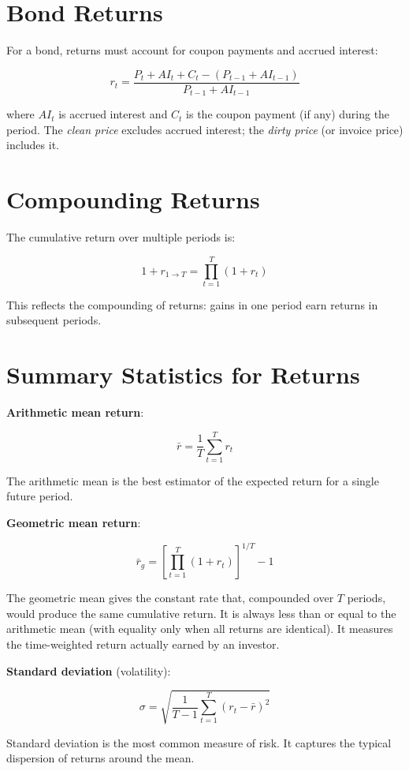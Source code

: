 \documentclass[11pt,letterpaper]{report}
\begin{document}
\section{Bond Returns}


For a bond, returns must account for coupon payments and accrued interest:

$$r_t = \frac{P_t + AI_t + C_t - (P_{t-1} + AI_{t-1})}{P_{t-1} + AI_{t-1}}$$

where $AI_t$ is accrued interest and $C_t$ is the coupon payment (if any) during the period.  The \textit{clean price} excludes accrued interest; the \textit{dirty price} (or invoice price) includes it.

\section{Compounding Returns}


The cumulative return over multiple periods is:

$$1 + r_{1 \to T} = \prod_{t=1}^{T}(1 + r_t)$$

This reflects the compounding of returns: gains in one period earn returns in subsequent periods.

\section{Summary Statistics for Returns}


\textbf{Arithmetic mean return}:

$$\bar{r} = \frac{1}{T}\sum_{t=1}^{T} r_t$$

The arithmetic mean is the best estimator of the expected return for a single future period.

\textbf{Geometric mean return}:

$$\bar{r}_g = \left[\prod_{t=1}^{T}(1+r_t)\right]^{1/T} - 1$$

The geometric mean gives the constant rate that, compounded over $T$ periods, would produce the same cumulative return.  It is always less than or equal to the arithmetic mean (with equality only when all returns are identical).  It measures the time-weighted return actually earned by an investor.

\textbf{Standard deviation} (volatility):

$$\sigma = \sqrt{\frac{1}{T-1}\sum_{t=1}^{T}(r_t - \bar{r})^2}$$

Standard deviation is the most common measure of risk.  It captures the typical dispersion of returns around the mean.
\end{document}
